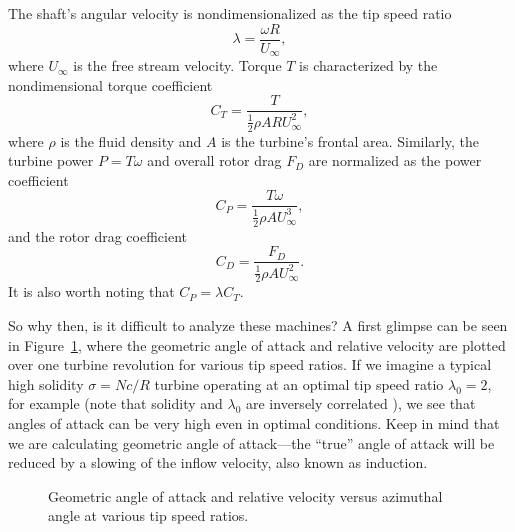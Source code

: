 The shaft's angular velocity is nondimensionalized as the tip speed ratio
\begin{equation}
    \lambda = \frac{\omega R}{U_\infty},
    \label{eq:lambda}
\end{equation}
where $U_\infty$ is the free stream velocity.
Torque $T$ is characterized by the nondimensional torque coefficient 
\begin{equation}
    C_T = \frac{T}{\frac{1}{2} \rho A R U_\infty^2},
    \label{eq:ct}
\end{equation}
where $\rho$ is the fluid density and $A$ is the turbine's frontal area.
Similarly, the turbine power $P = T\omega$ and overall rotor drag $F_D$ are
normalized as the power coefficient
\begin{equation}
    C_P = \frac{T \omega}{\frac{1}{2} \rho A U_\infty^3},
    \label{eq:cp}
\end{equation}
and the rotor drag coefficient
\begin{equation}
    C_D = \frac{F_D}{\frac{1}{2} \rho A U_\infty^2}.
    \label{eq:cd}
\end{equation}
It is also worth noting that $C_P = \lambda C_T$.

So why then, is it difficult to analyze these machines? A first glimpse can be
seen in Figure~\ref{fig:geom-alpha-urel}, where the geometric angle of attack
and relative velocity are plotted over one turbine revolution for various tip
speed ratios. If we imagine a typical high solidity $\sigma = Nc/R$ turbine
operating at an optimal tip speed ratio $\lambda_0 = 2$, for example
\cite{Howell2010} (note that solidity and $\lambda_0$ are inversely correlated
\cite{Templin1974}), we see that angles of attack can be very high even in
optimal conditions. Keep in mind that we are calculating geometric angle of
attack---the ``true'' angle of attack will be reduced by a slowing of the inflow
velocity, also known as induction. 

\begin{figure}[ht]
    \caption{Geometric angle of attack and relative velocity versus azimuthal
        angle at various tip speed ratios.}
    
    \label{fig:geom-alpha-urel}
\end{figure}

